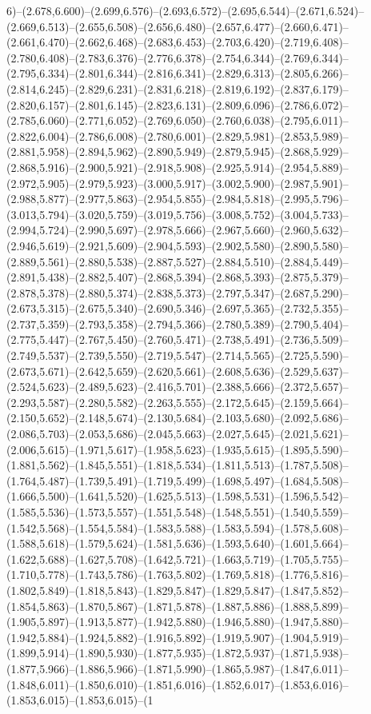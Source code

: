 6)--(2.678,6.600)--(2.699,6.576)--(2.693,6.572)--(2.695,6.544)--(2.671,6.524)--(2.669,6.513)--(2.655,6.508)--(2.656,6.480)--(2.657,6.477)--(2.660,6.471)--(2.661,6.470)--(2.662,6.468)--(2.683,6.453)--(2.703,6.420)--(2.719,6.408)--(2.780,6.408)--(2.783,6.376)--(2.776,6.378)--(2.754,6.344)--(2.769,6.344)--(2.795,6.334)--(2.801,6.344)--(2.816,6.341)--(2.829,6.313)--(2.805,6.266)--(2.814,6.245)--(2.829,6.231)--(2.831,6.218)--(2.819,6.192)--(2.837,6.179)--(2.820,6.157)--(2.801,6.145)--(2.823,6.131)--(2.809,6.096)--(2.786,6.072)--(2.785,6.060)--(2.771,6.052)--(2.769,6.050)--(2.760,6.038)--(2.795,6.011)--(2.822,6.004)--(2.786,6.008)--(2.780,6.001)--(2.829,5.981)--(2.853,5.989)--(2.881,5.958)--(2.894,5.962)--(2.890,5.949)--(2.879,5.945)--(2.868,5.929)--(2.868,5.916)--(2.900,5.921)--(2.918,5.908)--(2.925,5.914)--(2.954,5.889)--(2.972,5.905)--(2.979,5.923)--(3.000,5.917)--(3.002,5.900)--(2.987,5.901)--(2.988,5.877)--(2.977,5.863)--(2.954,5.855)--(2.984,5.818)--(2.995,5.796)--(3.013,5.794)--(3.020,5.759)--(3.019,5.756)--(3.008,5.752)--(3.004,5.733)--(2.994,5.724)--(2.990,5.697)--(2.978,5.666)--(2.967,5.660)--(2.960,5.632)--(2.946,5.619)--(2.921,5.609)--(2.904,5.593)--(2.902,5.580)--(2.890,5.580)--(2.889,5.561)--(2.880,5.538)--(2.887,5.527)--(2.884,5.510)--(2.884,5.449)--(2.891,5.438)--(2.882,5.407)--(2.868,5.394)--(2.868,5.393)--(2.875,5.379)--(2.878,5.378)--(2.880,5.374)--(2.838,5.373)--(2.797,5.347)--(2.687,5.290)--(2.673,5.315)--(2.675,5.340)--(2.690,5.346)--(2.697,5.365)--(2.732,5.355)--(2.737,5.359)--(2.793,5.358)--(2.794,5.366)--(2.780,5.389)--(2.790,5.404)--(2.775,5.447)--(2.767,5.450)--(2.760,5.471)--(2.738,5.491)--(2.736,5.509)--(2.749,5.537)--(2.739,5.550)--(2.719,5.547)--(2.714,5.565)--(2.725,5.590)--(2.673,5.671)--(2.642,5.659)--(2.620,5.661)--(2.608,5.636)--(2.529,5.637)--(2.524,5.623)--(2.489,5.623)--(2.416,5.701)--(2.388,5.666)--(2.372,5.657)--(2.293,5.587)--(2.280,5.582)--(2.263,5.555)--(2.172,5.645)--(2.159,5.664)--(2.150,5.652)--(2.148,5.674)--(2.130,5.684)--(2.103,5.680)--(2.092,5.686)--(2.086,5.703)--(2.053,5.686)--(2.045,5.663)--(2.027,5.645)--(2.021,5.621)--(2.006,5.615)--(1.971,5.617)--(1.958,5.623)--(1.935,5.615)--(1.895,5.590)--(1.881,5.562)--(1.845,5.551)--(1.818,5.534)--(1.811,5.513)--(1.787,5.508)--(1.764,5.487)--(1.739,5.491)--(1.719,5.499)--(1.698,5.497)--(1.684,5.508)--(1.666,5.500)--(1.641,5.520)--(1.625,5.513)--(1.598,5.531)--(1.596,5.542)--(1.585,5.536)--(1.573,5.557)--(1.551,5.548)--(1.548,5.551)--(1.540,5.559)--(1.542,5.568)--(1.554,5.584)--(1.583,5.588)--(1.583,5.594)--(1.578,5.608)--(1.588,5.618)--(1.579,5.624)--(1.581,5.636)--(1.593,5.640)--(1.601,5.664)--(1.622,5.688)--(1.627,5.708)--(1.642,5.721)--(1.663,5.719)--(1.705,5.755)--(1.710,5.778)--(1.743,5.786)--(1.763,5.802)--(1.769,5.818)--(1.776,5.816)--(1.802,5.849)--(1.818,5.843)--(1.829,5.847)--(1.829,5.847)--(1.847,5.852)--(1.854,5.863)--(1.870,5.867)--(1.871,5.878)--(1.887,5.886)--(1.888,5.899)--(1.905,5.897)--(1.913,5.877)--(1.942,5.880)--(1.946,5.880)--(1.947,5.880)--(1.942,5.884)--(1.924,5.882)--(1.916,5.892)--(1.919,5.907)--(1.904,5.919)--(1.899,5.914)--(1.890,5.930)--(1.877,5.935)--(1.872,5.937)--(1.871,5.938)--(1.877,5.966)--(1.886,5.966)--(1.871,5.990)--(1.865,5.987)--(1.847,6.011)--(1.848,6.011)--(1.850,6.010)--(1.851,6.016)--(1.852,6.017)--(1.853,6.016)--(1.853,6.015)--(1.853,6.015)--(1